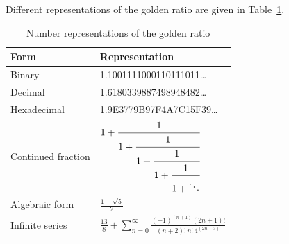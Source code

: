 Different representations of the golden ratio are given in Table~\ref{tab:goldenratio}.

\begin{table}[hbt!]\centering
\caption{Number representations of the golden ratio}
\label{tab:goldenratio}

\begin{tabular}{|l|l|}
\hline
Form & Representation\\\hline
Binary & 1.1001111000110111011\ldots\\\hline
Decimal & 1.6180339887498948482\ldots\\\hline
Hexadecimal	& 1.9E3779B97F4A7C15F39\ldots\\\hline
Continued fraction & $1 + \cfrac{1}{1 + \cfrac{1}{1 + \cfrac{1}{1 + \cfrac{1}{1 + \ddots}}}}$\\[6ex]\hline
Algebraic form & $\displaystyle\frac{1 + \sqrt{5}}{2}$\\[2ex]\hline
Infinite series & $\displaystyle\frac{13}{8}+\sum_{n=0}^{\infty}\frac{(-1)^{(n+1)}(2n+1)!}{(n+2)!\,n!\,4^{(2n+3)}}$\\[2ex]\hline
\end{tabular}
\end{table}
